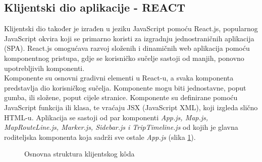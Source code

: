 \documentclass[zavrsnirad]{fer}
\begin{document}
\subsection{Klijentski dio aplikacije - REACT}
\label{sec:frontend}

Klijentski dio također je izrađen u jeziku JavaScript pomoću React.js, popularnog JavaScript okvira koji se primarno koristi za izgradnju jednostraničnih aplikacija (SPA). React.js omogućava razvoj složenih i dinamičnih web aplikacija pomoću komponentnog pristupa, gdje se korisničko sučelje sastoji od manjih, ponovno upotrebljivih komponenti.\\
Komponente su osnovni gradivni elementi u React-u, a svaka komponenta predstavlja dio korisničkog sučelja. Komponente mogu biti jednostavne, poput gumba, ili složene, poput cijele stranice. Komponente su definirane pomoću JavaScript funkcija ili klasa, te vraćaju JSX (JavaScript XML), koji izgleda slično HTML-u.
\newpage
Aplikacija se sastoji od par komponenti \textit{App.js, Map.js, MapRouteLine.js, Marker.js, Sidebar.js i TripTimeline.js} od kojih je glavna roditeljska komponenta koja sadrži sve ostale \textit{App.js} (slika \ref{slk:strukturaklijent}).

\begin{figure}[H]
	\caption{Osnovna struktura klijentskog kôda}
	\label{slk:strukturaklijent}
\end{figure}
\end{document}

